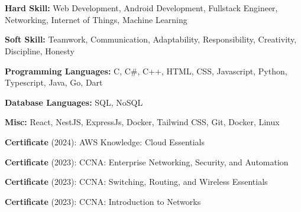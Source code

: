 \documentclass[../main.tex]{subfiles}
\begin{document}
\section{}

\begin{highlights}
	\item \textbf{Hard Skill:} Web Development, Android Development, Fullstack Engineer, Networking, Internet of Things, Machine Learning
	\item \textbf{Soft Skill:} Teamwork, Communication, Adaptability, Responsibility, Creativity, Discipline, Honesty
	\item \textbf{Programming Languages:} C, C\#, C++, HTML, CSS, Javascript, Python, Typescript, Java, Go, Dart
	\item \textbf{Database Languages:} SQL, NoSQL
	\item \textbf{Misc:} React, NestJS, ExpressJs, Docker, Tailwind CSS, Git, Docker, Linux
	\item \textbf{Certificate} (2024): AWS Knowledge: Cloud Essentials
	\item \textbf{Certificate} (2023): CCNA: Enterprise Networking, Security, and Automation
	\item \textbf{Certificate} (2023): CCNA: Switching, Routing, and Wireless Essentials
	\item \textbf{Certificate} (2023): CCNA: Introduction to Networks
\end{highlights}
\end{document}
